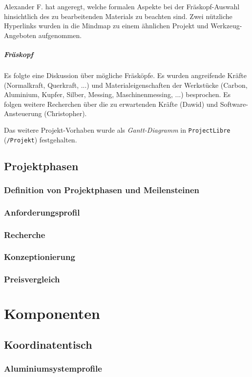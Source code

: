 \documentclass[
	a4paper,
	smallheadings,
	german,
	]
	{scrreprt}
\begin{document}
Alexander F. hat angeregt, welche formalen Aspekte bei der Fräskopf-Auswahl hinsichtlich des zu bearbeitenden Materials zu beachten sind.
Zwei nützliche Hyperlinks wurden in die Mindmap zu einem ähnlichen Projekt und Werkzeug-Angeboten aufgenommen.

\paragraph{Fräskopf}
Es folgte eine Diskussion über mögliche Fräsköpfe.
Es wurden angreifende Kräfte (Normalkraft, Querkraft, ...) und Materialeigenschaften der Werkstücke (Carbon, Aluminium, Kupfer, Silber, Messing, Maschinenmessing, ...)  besprochen.
Es folgen weitere Recherchen über die zu erwartenden Kräfte (Dawid) und Software-Ansteuerung (Christopher).

Das weitere Projekt-Vorhaben wurde als \textit{Gantt-Diagramm} in \texttt{ProjectLibre} (\texttt{/Projekt}) festgehalten. 


\section{Projektphasen}
\subsection{Definition von Projektphasen und Meilensteinen}
\subsection{Anforderungsprofil}
\subsection{Recherche}
\subsection{Konzeptionierung}
\subsection{Preisvergleich}

\chapter{Komponenten}
\section{Koordinatentisch}
	\subsection{Aluminiumsystemprofile}
\end{document}
